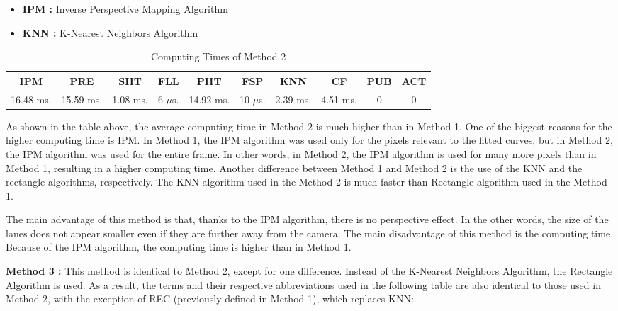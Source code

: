 \begin{itemize}[noitemsep]
\item\textbf{IPM : }Inverse Perspective Mapping Algorithm
\item\textbf{KNN : }K-Nearest Neighbors Algorithm
\end{itemize}


\begin{table}[ht]
\caption{Computing Times of Method 2} 
\centering 
  \begin{tabular}{ | c | c | c | c | c | c | c | c | c | c |}
    \hline
  
  IPM 		& PRE 		& SHT	   & FLL 	   & PHT 	   & FSP 	    & KNN 	   & CF 	  & PUB 	& ACT \\ \hline  
  16.48 ms. & 15.59 ms. & 1.08 ms. & 6 $\mu$s. & 14.92 ms. & 10 $\mu$s. & 2.39 ms. & 4.51 ms. & 0       & 0   \\ \hline  
    
      \end{tabular}
  \label{tab:Case2_Times}
\end{table}

As shown in the table above, the average computing time in Method 2 is much higher than in Method 1. One of the biggest reasons for the higher computing time is IPM. In Method 1, the IPM algorithm was used only for the pixels relevant to the fitted curves, but in Method 2, the IPM algorithm was used for the entire frame. In other words, in Method 2, the IPM algorithm is used for many more pixels than in Method 1, resulting in a higher computing time. Another difference between Method 1 and Method 2 is the use of the KNN and the rectangle algorithms, respectively. The KNN algorithm used in the Method 2 is much faster than Rectangle algorithm used in the Method 1.

The main advantage of this method is that, thanks to the IPM algorithm, there is no perspective
effect. In the other words, the size of the lanes does not appear smaller even if they are further away from the camera. The main disadvantage of this method is the computing time. Because of the IPM algorithm, the computing time is higher than in Method 1.



\textbf{Method 3 : }This method is identical to Method 2, except for one difference. Instead of the
K-Nearest Neighbors Algorithm, the Rectangle Algorithm is used. As a result, the terms and their respective abbreviations used in the following table are also identical to those used in Method 2, with the exception of REC (previously defined in Method 1), which replaces KNN:


